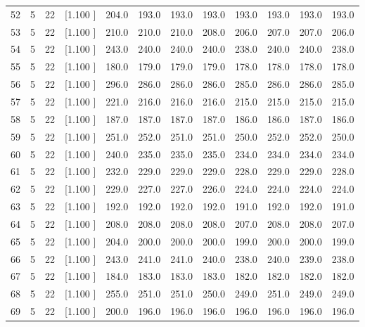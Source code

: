 \documentclass[12pt,a4paper]{article}
\begin{document}
\begin{center}
{\begin{tabular}{r r r r r r r r r r r r}
  52&  5& 22&[1.100     ]&   204.0&   193.0&   193.0&   193.0&   193.0&   193.0&   193.0&   193.0\\[-0.02in]
  53&  5& 22&[1.100     ]&   210.0&   210.0&   210.0&   208.0&   206.0&   207.0&   207.0&   206.0\\[-0.02in]
  54&  5& 22&[1.100     ]&   243.0&   240.0&   240.0&   240.0&   238.0&   240.0&   240.0&   238.0\\[-0.02in]
  55&  5& 22&[1.100     ]&   180.0&   179.0&   179.0&   179.0&   178.0&   178.0&   178.0&   178.0\\[-0.02in]
  56&  5& 22&[1.100     ]&   296.0&   286.0&   286.0&   286.0&   285.0&   286.0&   286.0&   285.0\\[-0.02in]
  57&  5& 22&[1.100     ]&   221.0&   216.0&   216.0&   216.0&   215.0&   215.0&   215.0&   215.0\\[-0.02in]
  58&  5& 22&[1.100     ]&   187.0&   187.0&   187.0&   187.0&   186.0&   186.0&   187.0&   186.0\\[-0.02in]
  59&  5& 22&[1.100     ]&   251.0&   252.0&   251.0&   251.0&   250.0&   252.0&   252.0&   250.0\\[-0.02in]
  60&  5& 22&[1.100     ]&   240.0&   235.0&   235.0&   235.0&   234.0&   234.0&   234.0&   234.0\\[-0.02in]
  61&  5& 22&[1.100     ]&   232.0&   229.0&   229.0&   229.0&   228.0&   229.0&   229.0&   228.0\\[-0.02in]
  62&  5& 22&[1.100     ]&   229.0&   227.0&   227.0&   226.0&   224.0&   224.0&   224.0&   224.0\\[-0.02in]
  63&  5& 22&[1.100     ]&   192.0&   192.0&   192.0&   192.0&   191.0&   192.0&   192.0&   191.0\\[-0.02in]
  64&  5& 22&[1.100     ]&   208.0&   208.0&   208.0&   208.0&   207.0&   208.0&   208.0&   207.0\\[-0.02in]
  65&  5& 22&[1.100     ]&   204.0&   200.0&   200.0&   200.0&   199.0&   200.0&   200.0&   199.0\\[-0.02in]
  66&  5& 22&[1.100     ]&   243.0&   241.0&   241.0&   240.0&   238.0&   240.0&   239.0&   238.0\\[-0.02in]
  67&  5& 22&[1.100     ]&   184.0&   183.0&   183.0&   183.0&   182.0&   182.0&   182.0&   182.0\\[-0.02in]
  68&  5& 22&[1.100     ]&   255.0&   251.0&   251.0&   250.0&   249.0&   251.0&   249.0&   249.0\\[-0.02in]
  69&  5& 22&[1.100     ]&   200.0&   196.0&   196.0&   196.0&   196.0&   196.0&   196.0&   196.0\\[-0.02in]

\end{tabular}}
\end{center}
\end{document}
